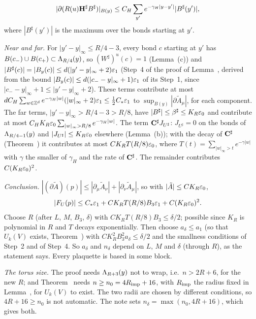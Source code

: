 \begin{detail}
\begin{step}
\[
|\partial(R(u)\mathbf H^\sharp B^\sharp)|_{B(y)}\le C_H\sum_{y'}e^{-\gamma_H|y-y'|}|B^\sharp(y')|,
\]
where $|B^\sharp(y')|$ is the maximum over the bonds starting at $y'$.
\end{step}
\begin{step}
\emph{Near and far.} For $|y'-y|_\infty\le R/4-3$, every bond $c$ starting at $y'$ has $B(c_-)\cup B(c_+)\subset\Lambda_{R/4}(y)$, so $(W^\sharp)^u(c)=1$ (Lemma~(c)) and $|B^\sharp(c)|=|B_y(c)|\le d(|y'-y|_\infty+2)\varepsilon_1$ (Step~4 of the proof of Lemma~, derived from the bound $|B_y(c)|\le d(|c_--y|_\infty+1)\varepsilon_1$ of its Step~1, since $|c_--y|_\infty+1\le|y'-y|_\infty+2$). These terms contribute at most $dC_H\sum_{w\in\mathbb Z^d}e^{-\gamma_H|w|}(|w|_\infty+2)\varepsilon_1\le\frac12C_*\varepsilon_1$ to $\sup_{B(y)}|\partial\tilde A_{\mu}|$, for each component. The far terms, $|y'-y|_\infty>R/4-3>R/8$, have $|B^\sharp|\le\beta^\sharp\le K_R\varepsilon_0$ and contribute at most $C_HK_R\varepsilon_0\sum_{|w|_\infty>R/8}e^{-\gamma_H|w|}$. The term $\mathbf C^\sharp J_{U^\sharp}$: $J_{U^\sharp}=0$ on the bonds of $\Lambda_{R/4-1}(y)$ and $|J_{U^\sharp}|\le K_R\varepsilon_0$ elsewhere (Lemma~(b)); with the decay of $\mathbf C^\sharp$ (Theorem~) it contributes at most $CK_RT(R/8)\varepsilon_0$, where $T(t)=\sum_{|w|_\infty>t}e^{-\gamma|w|}$ with $\gamma$ the smaller of $\gamma_H$ and the rate of $\mathbf C^\sharp$. The remainder contributes $C(K_R\varepsilon_0)^2$.
\end{step}
\begin{step}
\emph{Conclusion.} $|(\partial\tilde A)(p)|\le|\partial_\mu\tilde A_\nu|+|\partial_\nu\tilde A_\mu|$, so with $|\tilde A|\le CK_R\varepsilon_0$,
\[
|F_U(p)|\le C_*\varepsilon_1+CK_RT(R/8)B_3\varepsilon_1+C(K_R\varepsilon_0)^2 .
\]
Choose $R$ (after $L$, $M$, $B_3$, $\delta$) with $CK_RT(R/8)B_3\le\delta/2$; possible since $K_R$ is polynomial in $R$ and $T$ decays exponentially. Then choose $a_\delta\le a_1$ (so that $U_k(V)$ exists, Theorem~) with $CK_R^2B_3^2a_\delta\le\delta/2$ and the smallness conditions of Step~2 and of Step~4. So $a_\delta$ and $n_\delta$ depend on $L$, $M$ and $\delta$ (through $R$), as the statement says. Every plaquette is based in some block.
\end{step}
\begin{step}
\emph{The torus size.} The proof needs $\Lambda_{R+3}(y)$ not to wrap, i.e.\ $n>2R+6$, for the new $R$; and Theorem~ needs $n\ge n_0=4R_{\rm imp}+16$, with $R_{\rm imp}$ the radius fixed in Lemma~, for $U_k(V)$ to exist. The two radii are chosen by different conditions, so $4R+16\ge n_0$ is not automatic. The note sets $n_\delta=\max(n_0,4R+16)$, which gives both.
\end{step}
\end{detail}

